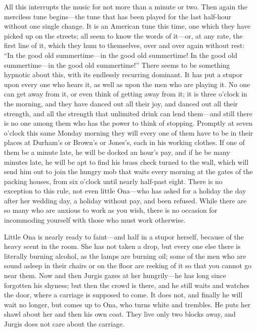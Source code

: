 \documentclass[
]{book}
\theoremstyle{definition}
\theoremstyle{definition}
\theoremstyle{definition}
\theoremstyle{definition}
\theoremstyle{remark}
\begin{document}
All this interrupts the music for not more than a minute or two. Then again the merciless tune begins---the tune that has been played for the last half-hour without one single change. It is an American tune this time, one which they have picked up on the streets; all seem to know the words of it---or, at any rate, the first line of it, which they hum to themselves, over and over again without rest: ``In the good old summertime---in the good old summertime! In the good old summertime---in the good old summertime!'' There seems to be something hypnotic about this, with its endlessly recurring dominant. It has put a stupor upon every one who hears it, as well as upon the men who are playing it. No one can get away from it, or even think of getting away from it; it is three o'clock in the morning, and they have danced out all their joy, and danced out all their strength, and all the strength that unlimited drink can lend them---and still there is no one among them who has the power to think of stopping. Promptly at seven o'clock this same Monday morning they will every one of them have to be in their places at Durham's or Brown's or Jones's, each in his working clothes. If one of them be a minute late, he will be docked an hour's pay, and if he be many minutes late, he will be apt to find his brass check turned to the wall, which will send him out to join the hungry mob that waits every morning at the gates of the packing houses, from six o'clock until nearly half-past eight. There is no exception to this rule, not even little Ona---who has asked for a holiday the day after her wedding day, a holiday without pay, and been refused. While there are so many who are anxious to work as you wish, there is no occasion for incommoding yourself with those who must work otherwise.

Little Ona is nearly ready to faint---and half in a stupor herself, because of the heavy scent in the room. She has not taken a drop, but every one else there is literally burning alcohol, as the lamps are burning oil; some of the men who are sound asleep in their chairs or on the floor are reeking of it so that you cannot go near them. Now and then Jurgis gazes at her hungrily---he has long since forgotten his shyness; but then the crowd is there, and he still waits and watches the door, where a carriage is supposed to come. It does not, and finally he will wait no longer, but comes up to Ona, who turns white and trembles. He puts her shawl about her and then his own coat. They live only two blocks away, and Jurgis does not care about the carriage.
\end{document}
